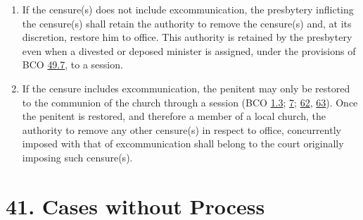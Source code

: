 \documentclass[
]{book}
\providecommand{\tightlist}{%
  \setlength{\itemsep}{0pt}\setlength{\parskip}{0pt}}
\begin{document}
\begin{enumerate}
  \begin{enumerate}
  \def\labelenumii{\alph{enumii}.}
  \tightlist
  \item
    If the censure(s) does not include excommunication, the presbytery inflicting the censure(s) shall retain the authority to remove the censure(s) and, at its discretion, restore him to office. This authority is retained by the presbytery even when a divested or deposed minister is assigned, under the provisions of BCO \protect\hyperlink{49.7}{49.7}, to a session.
  \item
    If the censure includes excommunication, the penitent may only be restored to the communion of the church through a session (BCO \protect\hyperlink{1.3}{1.3}; \protect\hyperlink{7}{7}; \protect\hyperlink{62}{62}, \protect\hyperlink{63}{63}). Once the penitent is restored, and therefore a member of a local church, the authority to remove any other censure(s) in respect to office, concurrently imposed with that of excommunication shall belong to the court originally imposing such censure(s).
  \end{enumerate}
\end{enumerate}

\hypertarget{cases-without-process}{%
\section*{41. Cases without Process}\label{cases-without-process}}

\protect\hypertarget{chapter-slug-41-cases-without-process}{\href{}{}}
\end{document}
